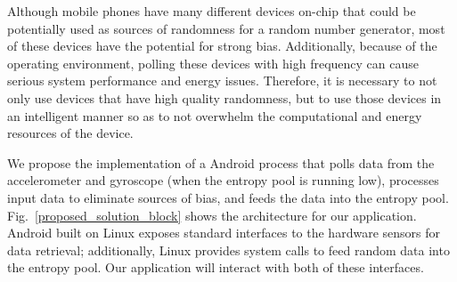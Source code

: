 Although mobile phones have many different devices on-chip that could be
potentially used as sources of randomness for a random number generator, most of
these devices have the potential for strong bias.  Additionally, because of the
operating environment, polling these devices with high frequency can cause
serious system performance and energy issues.  Therefore, it is necessary to not
only use devices that have high quality randomness, but to use those devices in
an intelligent manner so as to not overwhelm the computational and energy
resources of the device.

We propose the implementation of a Android process that polls data from the
accelerometer and gyroscope (when the entropy pool is running low), processes
input data to eliminate sources of bias, and feeds the data into the entropy
pool.  Fig.~\ref{proposed_solution_block} shows the architecture for our
application. Android built on Linux exposes standard interfaces to the hardware
sensors for data retrieval; additionally, Linux provides system calls to feed
random data into the entropy pool.  Our application will interact with both of
these interfaces.

%


